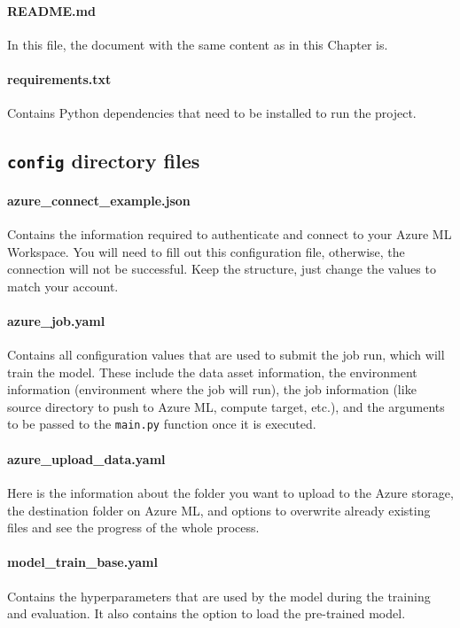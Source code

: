 \paragraph{README.md}
In this file, the document with the same content as in this Chapter is.

\paragraph{requirements.txt}
Contains Python dependencies that need to be installed to run the project.

\subsection{\texttt{config} directory files}
\label{config-directory-files}

\paragraph{azure\_connect\_example.json}
Contains the information required to authenticate and connect to your
Azure ML Workspace. You will need to fill out this configuration file, otherwise, the
connection will not be successful. Keep the structure, just change the
values to match your account.

\paragraph{azure\_job.yaml}
Contains all configuration values that are used to submit the job run,
which will train the model. These include the data asset information,
the environment information (environment where the job will run), the
job information (like source directory to push to Azure ML, compute
target, etc.), and the arguments to be passed to the \texttt{main.py}
function once it is executed.

\paragraph{azure\_upload\_data.yaml}
Here is the information about the folder you want to upload to the
Azure storage, the destination folder on Azure ML, and options to
overwrite already existing files and see the progress of the whole
process.

\paragraph{model\_train\_base.yaml}
Contains the hyperparameters that are used by the model during the
training and evaluation. It also contains the option to load the
pre-trained model.

